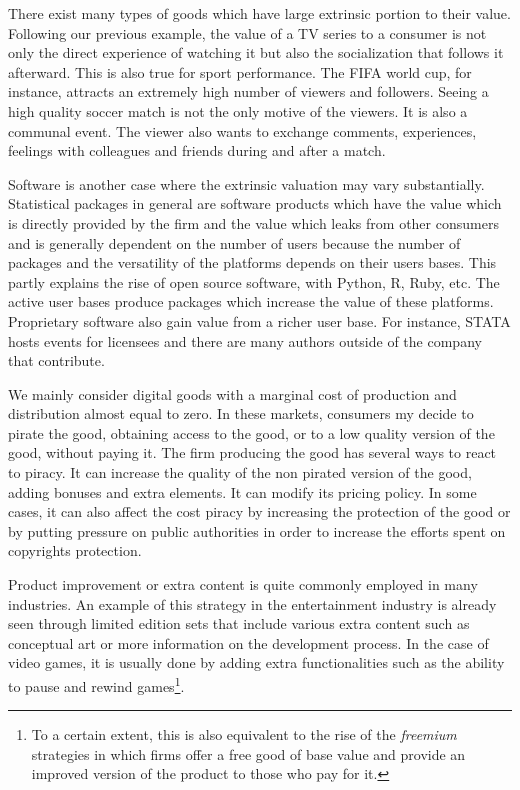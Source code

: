 \documentclass[12pt]{report}
\numberwithin{equation}{section}
\begin{document}
There exist many types of goods which have large extrinsic portion to their value. Following our previous example, the value of a TV series to a consumer is not only the direct experience of watching it but also the socialization that follows it afterward. This is also true for sport performance. The FIFA world cup, for instance, attracts an extremely high number of viewers and followers. Seeing a high quality soccer match is not the only motive of the viewers. It is also a communal event. The viewer also wants to exchange comments, experiences, feelings with colleagues and friends during and after a match. 

Software is another case where the extrinsic valuation may vary substantially. Statistical packages in general are software products which have the value which is directly provided by the firm and the value which leaks from other consumers and is generally dependent on the number of users because the number of packages and the versatility of the platforms depends on their users bases. This partly explains the rise of open source software, with Python, R, Ruby, etc.  The active user bases produce packages which increase the value of these platforms. Proprietary software also gain value from a richer user base. For instance, STATA hosts events for licensees and there are many authors outside of the company that contribute.

We mainly consider digital goods with a marginal cost of production and distribution almost equal to zero. In these markets, consumers my decide to pirate the good, obtaining access to the good, or to a low quality version of the good, without paying it. The firm producing the good has several ways to react to piracy. It can increase the quality of the non pirated version of the good, adding bonuses and extra elements. It can modify its pricing policy. In some cases, it can also affect the cost piracy by increasing the protection of the good or by putting pressure on public authorities in order to increase the efforts spent on copyrights protection. 

Product improvement or extra content is quite commonly employed in many industries. An example of this strategy in the entertainment industry is already seen through limited edition sets that include various extra content such as conceptual art or more information on the development process. In the case of video games, it is usually done by adding extra functionalities such as the ability to pause and rewind games\footnote{To a certain extent, this is also equivalent to the rise of the \textit{freemium} strategies in which firms offer a free good of base value and provide an improved version of the product to those who pay for it.}.
\end{document}
